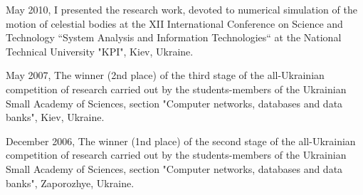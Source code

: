 \documentclass[helvetica,openbib,nologo,notitle,totpages]{europecv}
\begin{document}
\begin{europecv}
{\begin{list}{\textbullet}{}
	\item May 2010, I presented the research work, devoted to numerical simulation of the motion of celestial bodies at the XII International Conference on Science and Technology “System	Analysis and Information Technologies“ at the National Technical University "KPI", Kiev, Ukraine.
	
	\item May 2007, The winner (2nd place) of the third stage of the all-Ukrainian competition of research carried out by the students-members of the Ukrainian Small Academy of Sciences, section "Computer networks, databases and data banks", Kiev, Ukraine.
	
	\item December 2006, The winner (1nd place) of the second stage of the all-Ukrainian competition of research carried out by the students-members of the Ukrainian Small Academy of Sciences, section "Computer networks, databases and data banks", Zaporozhye, Ukraine.	
	
\end{list}
}






\end{europecv}
\end{document}
